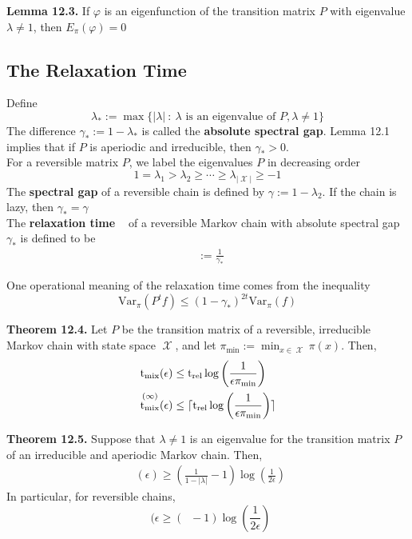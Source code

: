 \documentclass[12pt]{article}
\DeclareMathOperator*{\mix}{t_{\text{mix}}}
\DeclareMathOperator*{\rel}{t_{\text{rel}}}
\DeclareMathOperator*{\X}{\mathcal{X}}
\DeclarePairedDelimiter{\ceil}{\lceil}{\rceil}
\begin{document}
\textbf{Lemma 12.3.} If $\varphi$ is an eigenfunction of the transition matrix $P$ with eigenvalue $\lambda \neq 1$, then $E_{\pi}(\varphi) = 0$

\subsection{The Relaxation Time}

Define $$\lambda_* := \max \{ |\lambda| \ : \ \lambda \text{ is an eigenvalue of } P, \lambda \neq 1\}$$ The difference $\gamma_* := 1 - \lambda_*$ is called the \textbf{absolute spectral gap}. Lemma 12.1 implies that if $P$ is aperiodic and irreducible, then $\gamma_* > 0$.\\

For a reversible matrix $P$, we label the eigenvalues $P$ in decreasing order $$1 = \lambda_1 > \lambda_2 \geq \cdots \geq \lambda_{|\X|} \geq -1$$ The \textbf{spectral gap} of a reversible chain is defined by $\gamma := 1 - \lambda_2$. If the chain is lazy, then $\gamma_* = \gamma$\\

The \textbf{relaxation time} $\rel$ of a reversible Markov chain with absolute spectral gap $\gamma_*$ is defined to be
\begin{align*}
\rel := \frac{1}{\gamma_*}
\end{align*}

One operational meaning of the relaxation time comes from the inequality $$\text{Var}_{\pi}(P^tf) \leq (1 - \gamma_*)^{2t} \text{Var}_{\pi}(f)$$

\textbf{Theorem 12.4.} Let $P$ be the transition matrix of a reversible, irreducible Markov chain with state space $\X$, and let $\pi_{\min} := \min_{x \in \X} \pi(x)$. Then,
\begin{align*}
&\mix(\epsilon) \leq \rel \log \left(\frac{1}{\epsilon \pi_{\min}} \right)\\
&\mix^{(\infty)}(\epsilon) \leq \ceil{\rel \log \left(\frac{1}{\epsilon \pi_{\min}}\right)}
\end{align*}

\textbf{Theorem 12.5.} Suppose that $\lambda \neq 1$ is an eigenvalue for the transition matrix $P$ of an irreducible and aperiodic Markov chain. Then,
\begin{align*}
\mix(\epsilon) \geq \left( \frac{1}{1 - |\lambda|} - 1 \right) \log \left( \frac{1}{2\epsilon} \right)
\end{align*}
In particular, for reversible chains, $$\mix(\epsilon \geq (\rel - 1) \log \left( \frac{1}{2\epsilon} \right)$$
\end{document}
